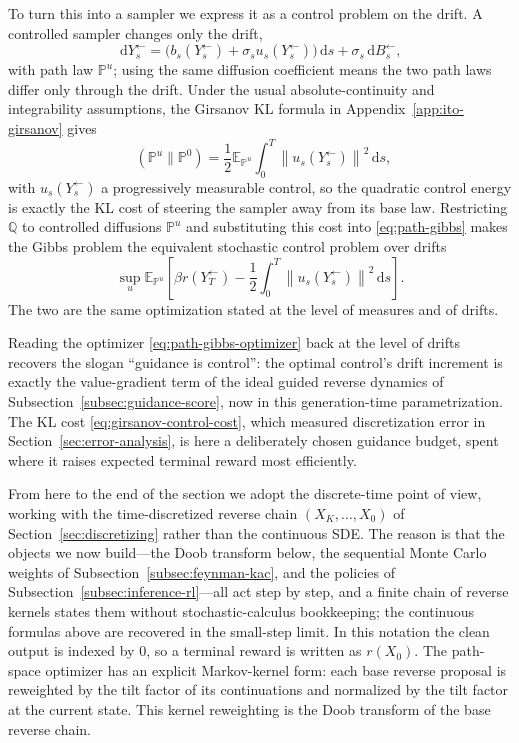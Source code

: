 \documentclass{amsart}
\numberwithin{equation}{section}
\theoremstyle{plain}
\theoremstyle{definition}
\theoremstyle{remark}
\DeclareMathOperator{\KL}{D_{\mathsf{KL}}}
\newcommand{\E}{\mathbb{E}}
\newcommand{\Pp}{\mathbb{P}}
\newcommand{\dd}{\,\mathrm{d}}
\newcommand{\norm}[1]{\left\lVert #1 \right\rVert}
\begin{document}
To turn this into a sampler we express it as a control problem on the drift.  A
controlled sampler changes only the drift,
\[
    \dd Y^{\leftarrow}_s=\bigl(b_s(Y^{\leftarrow}_s)+\sigma_s u_s(Y^{\leftarrow}_s)\bigr)\dd s+\sigma_s\dd B^{\leftarrow}_s,
\]
with path law $\Pp^u$; using the same diffusion coefficient means the two path
laws differ only through the drift.  Under the usual absolute-continuity and
integrability assumptions, the Girsanov KL formula in
Appendix~\ref{app:ito-girsanov} gives
\begin{equation}\label{eq:girsanov-control-cost}
    \KL(\Pp^u\|\Pp^0)
    =
    \frac12
    \E_{\Pp^u}\int_0^T\norm{u_s(Y^{\leftarrow}_s)}^2\dd s,
\end{equation}
with $u_s(Y^{\leftarrow}_s)$ a progressively measurable control, so the quadratic
control energy is exactly the KL cost of steering the sampler away from its base
law.  Restricting $\mathbb Q$ to controlled diffusions $\Pp^u$ and substituting
this cost into \eqref{eq:path-gibbs} makes the Gibbs problem the equivalent
stochastic control problem over drifts
\begin{equation}\label{eq:control-objective}
    \sup_u
    \E_{\Pp^u}\left[
    \beta r(Y^{\leftarrow}_T)
    -
    \frac12\int_0^T\norm{u_s(Y^{\leftarrow}_s)}^2\dd s
    \right].
\end{equation}
The two are the same optimization stated at the level of measures and of drifts.

Reading the optimizer \eqref{eq:path-gibbs-optimizer} back at the level of drifts
recovers the slogan ``guidance is control'': the optimal control's drift
increment is exactly the value-gradient term of the ideal guided reverse dynamics
of Subsection~\ref{subsec:guidance-score}, now in this generation-time
parametrization.  The KL cost \eqref{eq:girsanov-control-cost}, which measured
discretization error in Section~\ref{sec:error-analysis}, is here a deliberately
chosen guidance budget, spent where it raises expected terminal reward most
efficiently.

From here to the end of the section we adopt the discrete-time point of view,
working with the time-discretized reverse chain $(X_K,\ldots,X_0)$ of
Section~\ref{sec:discretizing} rather than the continuous SDE\@.  The reason is
that the objects we now build---the Doob transform below, the sequential Monte
Carlo weights of Subsection~\ref{subsec:feynman-kac}, and the policies of
Subsection~\ref{subsec:inference-rl}---all act step by step, and a finite chain
of reverse kernels states them without stochastic-calculus bookkeeping; the
continuous formulas above are recovered in the small-step limit.  In this
notation the clean output is indexed by $0$, so a terminal reward is written as
$r(X_0)$.  The path-space optimizer has an explicit Markov-kernel form: each
base reverse proposal is reweighted by the tilt factor of its continuations and
normalized by the tilt factor at the current state.  This kernel reweighting is
the Doob transform of the base reverse chain.
\end{document}
